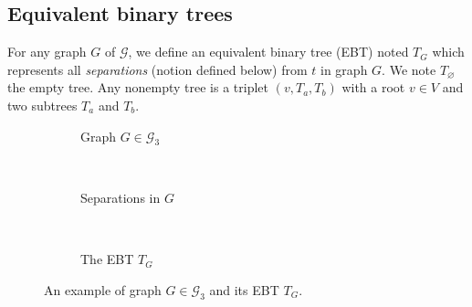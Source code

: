 \documentclass[preprint]{elsarticle}
\newcommand{\set}[1]{\left\{ #1 \right\}}
\newcommand{\card}[1]{\left| #1 \right|}
\newcommand{\mcalg}{\mathcal{G}}
\newcommand{\mts}{MS}
\newcommand{\ebt}{EBT}
\begin{document}
%

\subsection{Equivalent binary trees} \label{subsec:ebt}

For any graph $G$ of $\mcalg$, we define an equivalent binary tree (\ebt ) noted $T_G$ which represents all \textit{separations} (notion defined below) from $t$ in graph $G$. We note $T_\varnothing$ the empty tree. Any nonempty tree is a triplet $(v, T_a, T_b)$ with a root $v \in V$ and two subtrees $T_a$ and $T_b$.

\begin{figure}[h]
\centering
\begin{subfigure}[b]{0.33\columnwidth}
\centering
\scalebox{.42}{}
\caption{Graph $G \in \mcalg_3$}
\label{subfig:ebt_1}
\end{subfigure}
~
\begin{subfigure}[b]{0.33\columnwidth}
\centering
\scalebox{.42}{}
\caption{Separations in $G$}
\label{subfig:ebt_2}
\end{subfigure}
~
\begin{subfigure}[b]{0.28\columnwidth}
\centering
\scalebox{.58}{}
\caption{The EBT $T_G$}
\label{subfig:ebt_3}
\end{subfigure}
\caption{An example of graph $G \in \mcalg_3$ and its EBT $T_G$.}
\label{fig:ebt}
\end{figure}
\end{document}
